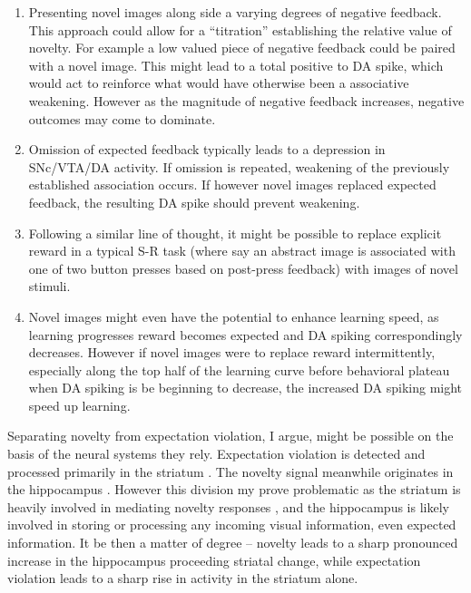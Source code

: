 \documentclass[doc]{apa}        %
\begin{document}
\begin{enumerate}
	\item Presenting novel images along side a varying degrees of negative feedback.  This approach could allow for a ``titration'' establishing the relative value of novelty.  For example a low valued piece of negative feedback could be paired with a novel image.  This might lead to a total positive to DA spike, which would act to reinforce what would have otherwise been a associative weakening.  However as the magnitude of negative feedback increases, negative outcomes may come to dominate.
	\item Omission of expected feedback typically leads to a depression in SNc/VTA/DA activity.  If omission is repeated, weakening of the previously established association occurs.  If however novel images replaced expected feedback, the resulting DA spike should prevent weakening.
	\item Following a similar line of thought, it might be possible to replace explicit reward in a typical S-R task (where say an abstract image is associated with one of two button presses based on post-press feedback) with images of novel stimuli. 
	\item Novel images might even have the potential to enhance learning speed, as learning progresses reward becomes expected and DA spiking correspondingly decreases.  However if novel images were to replace reward intermittently, especially along the top half of the learning curve before behavioral plateau when DA spiking is be beginning to decrease, the increased DA spiking might speed up learning.
\end{enumerate}

Separating novelty from expectation violation, I argue, might be possible on the basis of the neural systems they rely.  Expectation violation is detected and processed primarily in the striatum \cite{Brovelli:2008p1754}.  The novelty signal meanwhile originates in the hippocampus \cite{Lisman:2005p5455}.  However this division my prove problematic as the striatum is heavily involved in mediating novelty responses \cite{Wittmann:2008p541}, and the hippocampus is likely involved in storing or processing any incoming visual information, even expected information.  It be then a matter of degree -- novelty leads to a sharp pronounced increase in the hippocampus proceeding striatal change, while expectation violation leads to a sharp rise in activity in the striatum alone.
\end{document}
